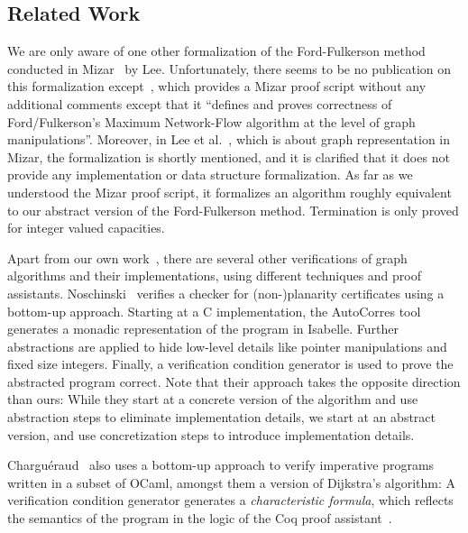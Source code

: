 \documentclass[smallcondensed]{svjour3}     %
\begin{document}
  
  \subsection{Related Work}\label{sec:related_work}
  We are only aware of one other formalization of the Ford-Fulkerson method conducted in Mizar~\cite{MaRu05} by Lee. Unfortunately, there seems to be no publication
  on this formalization except~\cite{Lee05}, which provides a Mizar proof script without any additional comments except that it ``defines and proves correctness of Ford/Fulkerson's Maximum Network-Flow algorithm at the level of graph manipulations''. Moreover, in Lee et al.~\cite{LeRu07}, which is about graph representation in Mizar, the formalization is shortly mentioned, and it is clarified that it does not provide any implementation or data structure formalization.
  As far as we understood the Mizar proof script, it formalizes an algorithm roughly equivalent to our abstract version of the Ford-Fulkerson method.
  Termination is only proved for integer valued capacities.
  
  Apart from our own work~\cite{La14,NoLa12}, there are several other verifications of graph algorithms and their implementations, using different techniques and proof assistants. Noschinski~\cite{Nosch15} verifies a checker for (non-)planarity certificates using a bottom-up approach. Starting at a C implementation,
  the AutoCorres tool~\cite{Greenaway15,GAK12} generates a monadic representation of the program in Isabelle. Further abstractions are applied
  to hide low-level details like pointer manipulations and fixed size integers. Finally, a verification condition
  generator is used to prove the abstracted program correct. Note that their approach takes the opposite direction than ours: While they start at a concrete version of the algorithm and use abstraction steps to eliminate implementation details, we start at an abstract version, and use concretization steps to introduce implementation details.

  Chargu\'eraud~\cite{char11} also uses a bottom-up approach to verify imperative programs written in a subset of OCaml, amongst them a version of Dijkstra's algorithm:
  A verification condition generator generates a \emph{characteristic formula}, which reflects the semantics of the program in the logic of the Coq proof assistant~\cite{BeCa10}.
  
\end{document}
